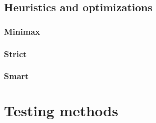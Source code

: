 \section{Heuristics and optimizations}
\subsection{Minimax}
\subsection{Strict}
\subsection{Smart}


\chapter{Testing methods}



